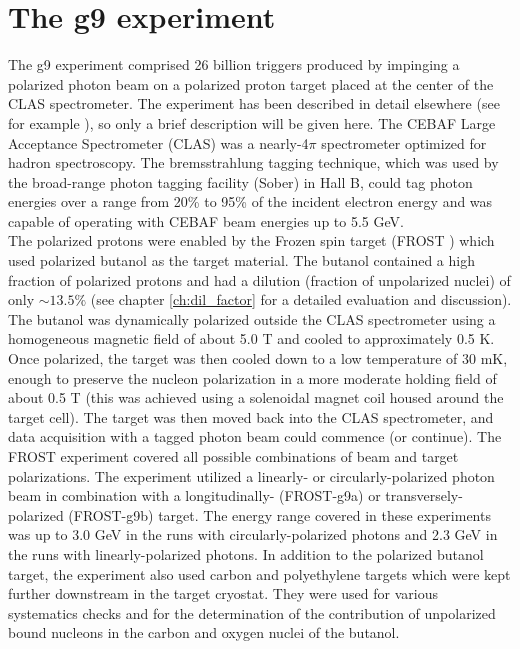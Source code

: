 \section{The g9 experiment}
The g9 experiment comprised 26 billion triggers produced by impinging  a  polarized photon beam on a polarized proton target placed at the center of the CLAS spectrometer. The experiment has been described in detail elsewhere (see for example \cite{Strauch_2014}), so only a brief description will be given here. 
 The CEBAF Large Acceptance Spectrometer (CLAS)\cite{CLAS} was a nearly-4$\pi$ spectrometer optimized for hadron spectroscopy. The bremsstrahlung tagging technique, which was used by the broad-range photon tagging facility (Sober\cite{Sober_2000}) in Hall B, could tag photon energies over a range from 20\% to 95\% of the incident electron energy and was capable of operating with CEBAF beam energies up to 5.5 GeV. \\
The polarized protons were enabled by the Frozen spin target (FROST \cite{Keith_2012}) which used polarized butanol as the target material.
The butanol contained a high fraction of polarized protons and had a dilution (fraction of unpolarized nuclei) of only $\sim 13.5\%$ (see chapter \ref{ch:dil_factor} for a detailed evaluation and discussion).
 The butanol was dynamically polarized outside the CLAS spectrometer using a homogeneous magnetic field of about 5.0 T and cooled to approximately 0.5 K. Once polarized, the target was then cooled down to a low temperature of 30 mK, enough to preserve the nucleon polarization in a more moderate holding field of about 0.5 T (this was achieved using a solenoidal magnet coil housed around the target cell). The target was then moved back into the CLAS spectrometer, and data acquisition with a tagged photon beam could commence (or continue). The FROST experiment covered all possible combinations of beam and target polarizations. The experiment utilized a linearly- or circularly-polarized photon beam in combination with a longitudinally- (FROST-g9a) or transversely-polarized (FROST-g9b) target. The energy range covered in these experiments was up to 3.0 GeV in the runs with circularly-polarized photons and 2.3 GeV in the runs with linearly-polarized photons. In addition to the polarized butanol target, the experiment also used carbon and polyethylene targets which were kept further downstream in the target cryostat. They were used for various systematics checks and for the determination of the contribution of unpolarized bound nucleons in the carbon and oxygen nuclei of the butanol.

